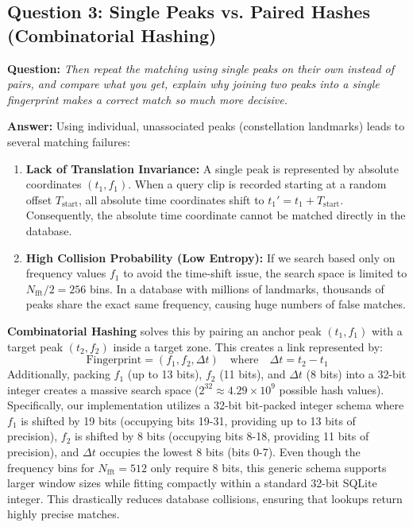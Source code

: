 \documentclass[11pt,a4paper]{article}
\begin{document}
\subsection{Question 3: Single Peaks vs. Paired Hashes (Combinatorial Hashing)}
\textbf{Question:} \textit{Then repeat the matching using single peaks on their own instead of pairs, and compare what you get, explain why joining two peaks into a single fingerprint makes a correct match so much more decisive.}

\textbf{Answer:}
Using individual, unassociated peaks (constellation landmarks) leads to several matching failures:
\begin{enumerate}
    \item \textbf{Lack of Translation Invariance:} A single peak is represented by absolute coordinates $(t_1, f_1)$. When a query clip is recorded starting at a random offset $T_{\text{start}}$, all absolute time coordinates shift to $t_1' = t_1 + T_{\text{start}}$. Consequently, the absolute time coordinate cannot be matched directly in the database.
    \item \textbf{High Collision Probability (Low Entropy):} If we search based only on frequency values $f_1$ to avoid the time-shift issue, the search space is limited to $N_{\text{fft}}/2 = 256$ bins. In a database with millions of landmarks, thousands of peaks share the exact same frequency, causing huge numbers of false matches.
\end{enumerate}

\textbf{Combinatorial Hashing} solves this by pairing an anchor peak $(t_1, f_1)$ with a target peak $(t_2, f_2)$ inside a target zone. This creates a link represented by:
\begin{equation}
    \text{Fingerprint} = (f_1, f_2, \Delta t) \quad \text{where} \quad \Delta t = t_2 - t_1
\end{equation}
Additionally, packing $f_1$ (up to 13 bits), $f_2$ (11 bits), and $\Delta t$ (8 bits) into a 32-bit integer creates a massive search space ($2^{32} \approx 4.29 \times 10^9$ possible hash values). Specifically, our implementation utilizes a 32-bit bit-packed integer schema where $f_1$ is shifted by 19 bits (occupying bits 19-31, providing up to 13 bits of precision), $f_2$ is shifted by 8 bits (occupying bits 8-18, providing 11 bits of precision), and $\Delta t$ occupies the lowest 8 bits (bits 0-7). Even though the frequency bins for $N_{\text{fft}} = 512$ only require 8 bits, this generic schema supports larger window sizes while fitting compactly within a standard 32-bit SQLite integer. This drastically reduces database collisions, ensuring that lookups return highly precise matches. 
\end{document}
